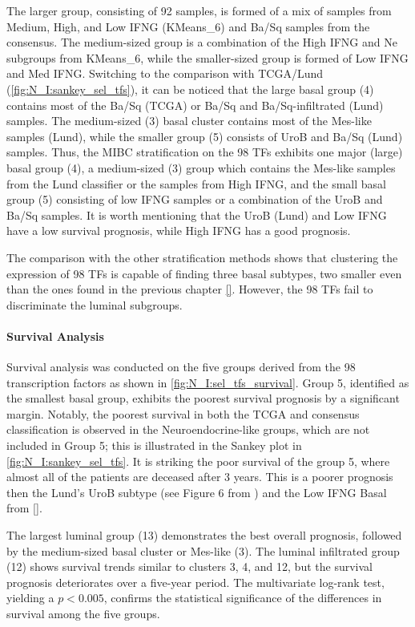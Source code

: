 The larger group, consisting of 92 samples, is formed of a mix of samples from Medium, High, and Low IFNG (KMeans\_6) and Ba/Sq samples from the consensus. The medium-sized group is a combination of the High IFNG and Ne subgroups from KMeans\_6, while the smaller-sized group is formed of Low IFNG and Med IFNG. Switching to the comparison with TCGA/Lund (\cref{fig:N_I:sankey_sel_tfs}), it can be noticed that the large basal group (4) contains most of the Ba/Sq (TCGA) or Ba/Sq and Ba/Sq-infiltrated (Lund) samples. The medium-sized (3) basal cluster contains most of the Mes-like samples (Lund), while the smaller group (5) consists of UroB and Ba/Sq (Lund) samples. Thus, the MIBC stratification on the 98 TFs exhibits one major (large) basal group (4), a medium-sized (3) group which contains the Mes-like samples from the Lund classifier or the samples from High IFNG, and the small basal group (5) consisting of low IFNG samples or a combination of the UroB and Ba/Sq samples. It is worth mentioning that the UroB (Lund) and Low IFNG have a low survival prognosis, while High IFNG has a good prognosis.

The comparison with the other stratification methods shows that clustering the expression of 98 TFs is capable of finding three basal subtypes, two smaller even than the ones found in the previous chapter \ref{}. However, the 98 TFs fail to discriminate the luminal subgroups.

\paragraph*{Survival Analysis}

Survival analysis was conducted on the five groups derived from the 98 transcription factors as shown in \cref{fig:N_I:sel_tfs_survival}. Group 5, identified as the smallest basal group, exhibits the poorest survival prognosis by a significant margin. Notably, the poorest survival in both the TCGA and consensus classification is observed in the Neuroendocrine-like groups, which are not included in Group 5; this is illustrated in the Sankey plot in \cref{fig:N_I:sankey_sel_tfs}. It is striking the poor survival of the group 5, where almost all of the patients are deceased after 3 years. This is a poorer prognosis then the Lund's UroB subtype (see Figure 6 from \citet{Marzouka2018-ge}) and the Low IFNG Basal from \ref{}.

The largest luminal group (13) demonstrates the best overall prognosis, followed by the medium-sized basal cluster or Mes-like (3). The luminal infiltrated group (12) shows survival trends similar to clusters 3, 4, and 12, but the survival prognosis deteriorates over a five-year period. The multivariate log-rank test, yielding a $p<0.005$, confirms the statistical significance of the differences in survival among the five groups.

